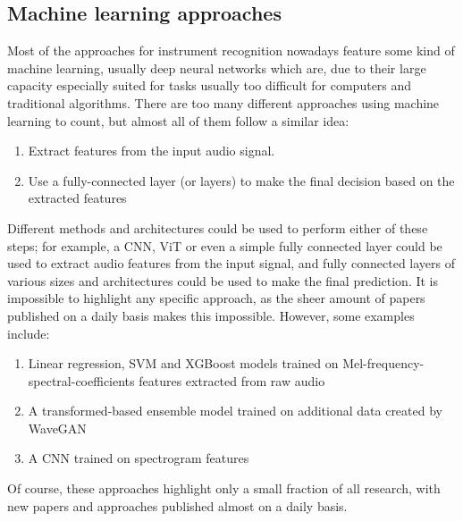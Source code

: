 \subsection{Machine learning approaches}

Most of the approaches for instrument recognition nowadays feature some kind of machine learning, usually deep neural networks which are, due to their large capacity especially suited for tasks usually too difficult for computers and traditional algorithms. There are too many different approaches using machine learning to count, but almost all of them follow a similar idea: 

\begin{enumerate}
  \item Extract features from the input audio signal.
  \item Use a fully-connected layer (or layers) to make the final decision based on the extracted features
\end{enumerate}

Different methods and architectures could be used to perform either of these steps; for example, a CNN, ViT or even a simple fully connected layer could be used to extract audio features from the input signal, and fully connected layers of various sizes and architectures could be used to make the final prediction. It is impossible to highlight any specific approach, as the sheer amount of papers published on a daily basis makes this impossible. However, some examples include:

\begin{enumerate}
  \item Linear regression, SVM and XGBoost models trained on Mel-frequency-spectral-coefficients features extracted from raw audio \cite{Racharla_2020} 
  \item A transformed-based ensemble model trained on additional data created by WaveGAN \cite{lekshmietal}
  \item A CNN trained on spectrogram features \cite{hanetal_2016}
\end{enumerate}

Of course, these approaches highlight only a small fraction of all research, with new papers and approaches published almost on a daily basis.
